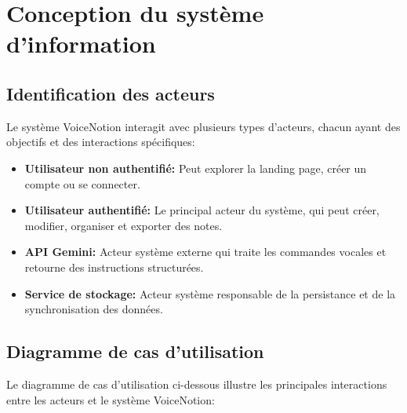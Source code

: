 \section{Conception du système d'information}

\subsection{Identification des acteurs}

Le système VoiceNotion interagit avec plusieurs types d'acteurs, chacun ayant des objectifs et des interactions spécifiques:

\begin{itemize}
    \item \textbf{Utilisateur non authentifié:} Peut explorer la landing page, créer un compte ou se connecter.
    
    \item \textbf{Utilisateur authentifié:} Le principal acteur du système, qui peut créer, modifier, organiser et exporter des notes.
    
    \item \textbf{API Gemini:} Acteur système externe qui traite les commandes vocales et retourne des instructions structurées.
    
    \item \textbf{Service de stockage:} Acteur système responsable de la persistance et de la synchronisation des données.
\end{itemize}

\subsection{Diagramme de cas d'utilisation}

Le diagramme de cas d'utilisation ci-dessous illustre les principales interactions entre les acteurs et le système VoiceNotion:

